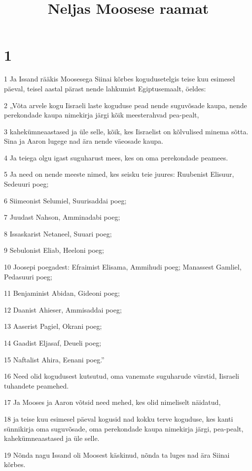 

\title{Neljas Moosese raamat}

\chapter{1}

\par 1 Ja Issand rääkis Moosesega Siinai kõrbes kogudusetelgis teise kuu esimesel päeval, teisel aastal pärast nende lahkumist Egiptusemaalt, öeldes:
\par 2 „Võta arvele kogu Iisraeli laste koguduse pead nende suguvõsade kaupa, nende perekondade kaupa nimekirja järgi kõik meesterahvad pea-pealt,
\par 3 kahekümneaastased ja üle selle, kõik, kes Iisraelist on kõlvulised minema sõtta. Sina ja Aaron lugege nad ära nende väeosade kaupa.
\par 4 Ja teiega olgu igast suguharust mees, kes on oma perekondade peamees.
\par 5 Ja need on nende meeste nimed, kes seisku teie juures: Ruubenist Elisuur, Sedeuuri poeg;
\par 6 Siimeonist Selumiel, Suurisaddai poeg;
\par 7 Juudast Nahson, Amminadabi poeg;
\par 8 Issaskarist Netaneel, Suuari poeg;
\par 9 Sebulonist Eliab, Heeloni poeg;
\par 10 Joosepi poegadest: Efraimist Elisama, Ammihudi poeg; Manassest Gamliel, Pedasuuri poeg;
\par 11 Benjaminist Abidan, Gideoni poeg;
\par 12 Daanist Ahieser, Ammisaddai poeg;
\par 13 Aaserist Pagiel, Okrani poeg;
\par 14 Gaadist Eljasaf, Deueli poeg;
\par 15 Naftalist Ahira, Eenani poeg.”
\par 16 Need olid kogudusest kutsutud, oma vanemate suguharude vürstid, Iisraeli tuhandete peamehed.
\par 17 Ja Mooses ja Aaron võtsid need mehed, kes olid nimeliselt näidatud,
\par 18 ja teise kuu esimesel päeval kogusid nad kokku terve koguduse, kes kanti sünnikirja oma suguvõsade, oma perekondade kaupa nimekirja järgi, pea-pealt, kahekümneaastased ja üle selle.
\par 19 Nõnda nagu Issand oli Moosest käskinud, nõnda ta luges nad ära Siinai kõrbes.
